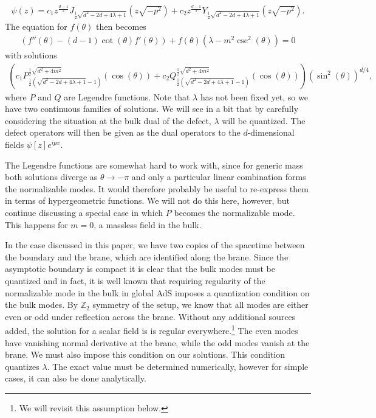 \begin{align}
    \psi(z) = c_1 z^{\frac{d-1}{2}} J_{\frac{1}{2} \sqrt{d^2-2 d+4 \lambda +1}}\left(z \sqrt{-p^2}\right)+c_2 z^{\frac{d-1}{2}} Y_{\frac{1}{2} \sqrt{d^2-2 d+4 \lambda +1}}\left(z \sqrt{-p^2}\right).
\end{align}
The equation for $f(\theta)$ then becomes
\begin{align}
\left(f''(\theta )-(d-1) \cot (\theta ) f'(\theta )\right)+f(\theta ) \left(\lambda - m^2 \csc ^2(\theta )\right)=0
\end{align}
with solutions
\begin{align}
    \left( c_1 P_{\frac{1}{2} \left(\sqrt{d^2-2 d+4 \lambda +1}-1\right)}^{\frac{1}{2} \sqrt{d^2+4 m^2}}(\cos (\theta ))+c_2 Q_{\frac{1}{2} \left(\sqrt{d^2-2 d+4 \lambda +1}-1\right)}^{\frac{1}{2} \sqrt{d^2+4 m^2}}(\cos (\theta ))\right)\left(\sin ^2(\theta )\right)^{d/4},
\end{align}
where $P$ and $Q$ are Legendre functions. Note that $\lambda$ has not been fixed yet, so we have two continuous families of solutions. We will see in a bit that by carefully considering the situation at the bulk dual of the defect, $\lambda$ will be quantized. The defect operators will then be given as the dual operators to the $d$-dimensional fields $\psi[z]e^{ipx}$.


The Legendre functions are somewhat hard to work with, since for generic mass both solutions diverge as $\theta \to - \pi$ and only a particular linear combination forms the normalizable modes. It would therefore probably be useful to re-express them in terms of hypergeometric functions. We will not do this here, however, but continue discussing a special case in which $P$ becomes the normalizable mode. This happens for $m=0$, a massless field in the bulk.

In the case discussed in this paper, we have two copies of the spacetime between the boundary and the brane, which are identified along the brane. Since the asymptotic boundary is compact it is clear that the bulk modes must be quantized and in fact, it is well known that requiring regularity of the normalizable mode in the bulk in global AdS imposes a quantization condition on the bulk modes. By $\mathbb Z_2$ symmetry of the setup, we know that all modes are either even or odd under reflection across the brane. Without any additional sources added, the solution for a scalar field is is regular everywhere.\footnote{We will revisit this assumption below.} The even modes have vanishing normal derivative at the brane, while the odd modes vanish at the brane. We must also impose this condition on our solutions. This condition quantizes $\lambda$. The exact value must be determined numerically, however for simple cases, it can also be done analytically.

